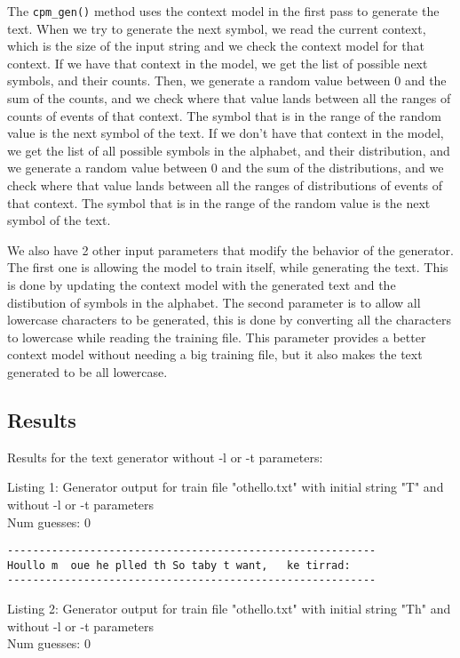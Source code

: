 \documentclass{article}
\begin{document}
The \verb|cpm_gen()| method uses the context model in the first pass to generate the text.
When we try to generate the next symbol, we read the current context, which is the size of the input string and we check the context model for that context. If we have that context in the model, we get the list of possible next symbols, and their counts. Then, we generate a random value between 0 and the sum of the counts, and we check where that value lands between all the ranges of counts of events of that context. The symbol that is in the range of the random value is the next symbol of the text.
If we don't have that context in the model, we get the list of all possible symbols in the alphabet, and their distribution, and we generate a random value between 0 and the sum of the distributions, and we check where that value lands between all the ranges of distributions of events of that context. The symbol that is in the range of the random value is the next symbol of the text. 

We also have 2 other input parameters that modify the behavior of the generator. The first one is allowing the model to train itself, while generating the text. This is done by updating the context model with the generated text and the distibution of symbols in the alphabet.
The second parameter is to allow all lowercase characters to be generated, this is done by converting all the characters to lowercase while reading the training file. This parameter provides a better context model without needing a big training file, but it also makes the text generated to be all lowercase.


\subsection{Results}


Results for the text generator without -l or -t parameters:

\hfill

Listing 1: Generator output for train file "othello.txt" with initial string "T" and without -l or -t parameters
\\Num guesses: 0

\begin{lstlisting}
----------------------------------------------------------
Houllo m  oue he plled th So taby t want,   ke tirrad:
----------------------------------------------------------
\end{lstlisting}

Listing 2: Generator output for train file "othello.txt" with initial string "Th" and without -l or -t parameters
\\Num guesses: 0
\end{document}
